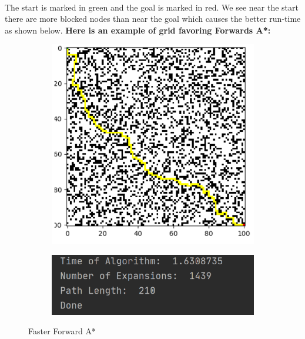 \documentclass{article}
\begin{document}
\\
The start is marked in green and the goal is marked in red.
We see near the start there are more blocked nodes than near the goal which causes the better run-time as shown below.
\newpage
\setcounter{figure}{0}
\textbf{Here is an example of grid favoring Forwards A*:}
\begin{figure}[h!]
\begin{subfigure}{.5\textwidth}
  \centering
  \includegraphics[width=.8\linewidth]{forwardA.png}
  \label{fig:sfig1}
\end{subfigure}%
\begin{subfigure}{.5\textwidth}
  \centering
  \includegraphics[width=.8\linewidth]{forwardAstats.png}
  \label{fig:sfig2}
\end{subfigure}
\caption{Faster Forward A*}
\label{fig:fig}
\end{figure}
\end{document}
